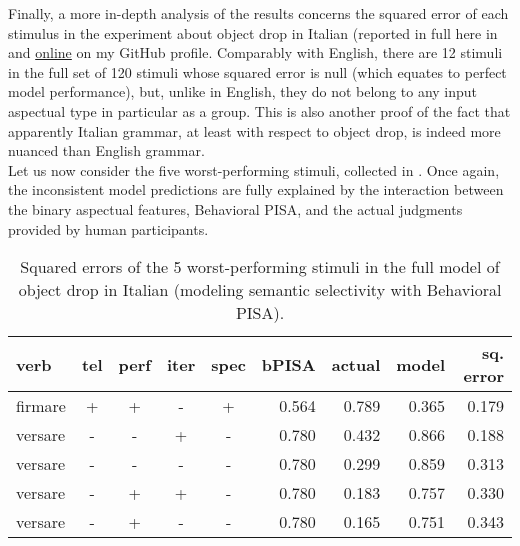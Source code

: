 Finally, a more in-depth analysis of the results concerns the squared error of each stimulus in the experiment about object drop in Italian (reported in full here in  and \href{https://github.com/giuliacappelli/dissertationData}{online} on my GitHub profile. Comparably with English, there are 12 stimuli in the full set of 120 stimuli whose squared error is null (which equates to perfect model performance), but, unlike in English, they do not belong to any input aspectual type in particular as a group. This is also another proof of the fact that apparently Italian grammar, at least with respect to object drop, is indeed more nuanced than English grammar.\\
Let us now consider the five worst-performing stimuli, collected in . Once again, the inconsistent model predictions are fully explained by the interaction between the binary aspectual features, Behavioral PISA, and the actual judgments provided by human participants.

\begin{table}[htb] %
\caption{Squared errors of the 5 worst-performing stimuli in the full model of object drop in Italian (modeling semantic selectivity with Behavioral PISA).}
\begin{tabular}{l|ccccr|rrr}
\textbf{verb}  & \textbf{tel} & \textbf{perf} & \textbf{iter} & \textbf{spec} & \textbf{bPISA}   & \textbf{actual} & \textbf{model} & \textbf{sq. error} \\
\hline
firmare & +  & +   & -   & +     & 0.564 & 0.789  & 0.365     & 0.179         \\
versare & -  & -   & +   & -     & 0.780  & 0.432  & 0.866     & 0.188         \\
versare & -  & -   & -   & -     & 0.780  & 0.299  & 0.859     & 0.313         \\
versare & -  & +   & +   & -     & 0.780  & 0.183  & 0.757     & 0.330          \\
versare & -  & +   & -   & -     & 0.780  & 0.165  & 0.751     & 0.343        
\end{tabular}
\end{table}

